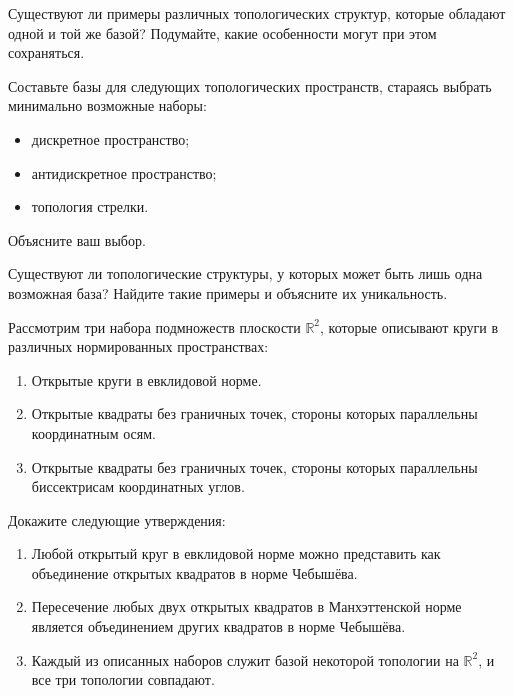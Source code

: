 \begin{task}
	Существуют ли примеры различных топологических структур, которые обладают одной и той же базой? Подумайте, какие особенности могут при этом сохраняться.
\end{task}

\begin{task}
	Составьте базы для следующих топологических пространств, стараясь выбрать минимально возможные наборы: 
\begin{itemize}
    \item дискретное пространство;
    \item антидискретное пространство;
    \item топология стрелки.
\end{itemize}
Объясните ваш выбор.
\end{task}

\begin{task}
	Существуют ли топологические структуры, у которых может быть лишь одна возможная база? Найдите такие примеры и объясните их уникальность.
\end{task}

	

\begin{task}
	Рассмотрим три набора подмножеств плоскости \( \mathbb{R}^2 \), которые описывают круги в различных нормированных пространствах:
	\begin{enumerate}
		\item Открытые круги в евклидовой норме.
		\item Открытые квадраты без граничных точек, стороны которых параллельны координатным осям.
		\item Открытые квадраты без граничных точек, стороны которых параллельны биссектрисам координатных углов.
	\end{enumerate}
	Докажите следующие утверждения:
	\begin{enumerate}
		\item Любой открытый круг в евклидовой норме можно представить как объединение открытых квадратов в норме Чебышёва.
		\item Пересечение любых двух открытых квадратов в Манхэттенской норме является объединением других квадратов в норме Чебышёва.
		\item Каждый из описанных наборов служит базой некоторой топологии на \( \mathbb{R}^2 \), и все три топологии совпадают.
	\end{enumerate}
\end{task}

